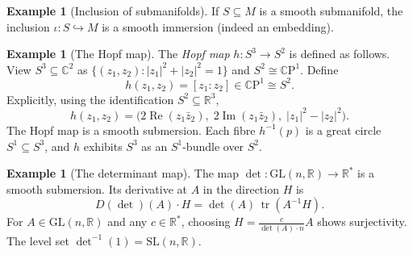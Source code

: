 \documentclass[12pt,a4paper,openany]{book}
\theoremstyle{definition}
\newtheorem{example}[theorem]{Example}
\theoremstyle{remark}
\newcommand{\R}{\mathbb{R}}
\newcommand{\C}{\mathbb{C}}
\newcommand{\CP}{\mathbb{C}\mathrm{P}}
\newcommand{\GL}{\mathrm{GL}}
\newcommand{\SL}{\mathrm{SL}}
\newcommand{\abs}[1]{\left\lvert #1 \right\rvert}
\begin{document}
\begin{example}[Inclusion of submanifolds]\label{ex:inclusion}
If $S \subseteq M$ is a smooth submanifold, the inclusion
$\iota \colon S \hookrightarrow M$ is a smooth immersion (indeed an
embedding).
\end{example}

\begin{example}[The Hopf map]\label{ex:hopf}
The \emph{Hopf map} $h \colon S^3 \to S^2$ is defined as follows.
View $S^3 \subseteq \C^2$ as $\{(z_1,z_2) : \abs{z_1}^2 + \abs{z_2}^2 = 1\}$
and $S^2 \cong \CP^1$.  Define
\[
  h(z_1, z_2) = [z_1 : z_2] \in \CP^1 \cong S^2.
\]
Explicitly, using the identification $S^2 \subseteq \R^3$,
\[
  h(z_1,z_2) = \bigl(2\operatorname{Re}(z_1 \bar{z}_2),\;
  2\operatorname{Im}(z_1 \bar{z}_2),\;
  \abs{z_1}^2 - \abs{z_2}^2\bigr).
\]
The Hopf map is a smooth submersion.  Each fibre $h^{-1}(p)$ is a great
circle $S^1 \subseteq S^3$, and $h$ exhibits $S^3$ as an $S^1$-bundle over
$S^2$.
\end{example}


\begin{center}
\label{fig:hopf}
\end{center}

\begin{example}[The determinant map]\label{ex:det-submersion}
The map $\det \colon \GL(n,\R) \to \R^*$ is a smooth submersion.  Its
derivative at $A$ in the direction $H$ is
\[
  D(\det)(A) \cdot H = \det(A)\, \operatorname{tr}(A^{-1}H).
\]
For $A \in \GL(n,\R)$ and any $c \in \R^*$, choosing $H = \frac{c}{\det(A)
\cdot n} A$ shows surjectivity.  The level set $\det^{-1}(1) = \SL(n,\R)$.
\end{example}
\end{document}
